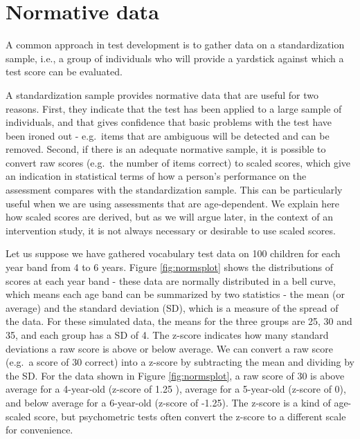 \documentclass{krantz}
\begin{document}
\hypertarget{normative-data}{%
\section{Normative data}\label{normative-data}}

A common approach in test development is to gather data on a standardization sample, i.e., a group of individuals who will provide a yardstick against which a test score can be evaluated.

A standardization sample provides normative data that are useful for two reasons. First, they indicate that the test has been applied to a large sample of individuals, and that gives confidence that basic problems with the test have been ironed out - e.g.~items that are ambiguous will be detected and can be removed. Second, if there is an adequate normative sample, it is possible to convert raw scores (e.g.~the number of items correct) to scaled scores, which give an indication in statistical terms of how a person's performance on the assessment compares with the standardization sample. This can be particularly useful when we are using assessments that are age-dependent. We explain here how scaled scores are derived, but as we will argue later, in the context of an intervention study, it is not always necessary or desirable to use scaled scores.

Let us suppose we have gathered vocabulary test data on 100 children for each year band from 4 to 6 years. Figure \ref{fig:normsplot} shows the distributions of scores at each year band - these data are normally distributed in a bell curve, which means each age band can be summarized by two statistics - the mean (or average) and the standard deviation (SD), which is a measure of the spread of the data. For these simulated data, the means for the three groups are 25, 30 and 35, and each group has a SD of 4. The z-score indicates how many standard deviations a raw score is above or below average. We can convert a raw score (e.g.~a score of 30 correct) into a z-score by subtracting the mean and dividing by the SD. For the data shown in Figure \ref{fig:normsplot}, a raw score of 30 is above average for a 4-year-old (z-score of 1.25 ), average for a 5-year-old (z-score of 0), and below average for a 6-year-old (z-score of -1.25). The z-score is a kind of age-scaled score, but psychometric tests often convert the z-score to a different scale for convenience.
\end{document}
